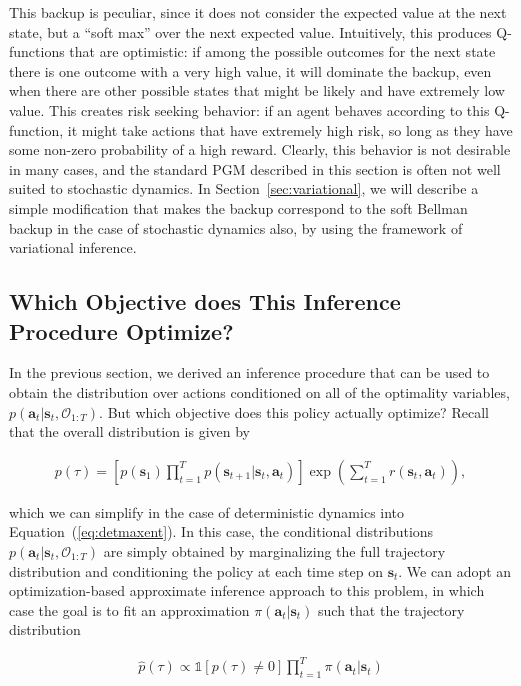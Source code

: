 This backup is peculiar, since it does not consider the expected value at the next state, but a ``soft max'' over the next expected value. Intuitively, this produces Q-functions that are optimistic: if among the possible outcomes for the next state there is one outcome with a very high value, it will dominate the backup, even when there are other possible states that might be likely and have extremely low value. This creates risk seeking behavior: if an agent behaves according to this Q-function, it might take actions that have extremely high risk, so long as they have some non-zero probability of a high reward. Clearly, this behavior is not desirable in many cases, and the standard PGM described in this section is often not well suited to stochastic dynamics. In Section~\ref{sec:variational}, we will describe a simple modification that makes the backup correspond to the soft Bellman backup in the case of stochastic dynamics also, by using the framework of variational inference.

\subsection{Which Objective does This Inference Procedure Optimize?}
\label{sec:maxentobjective}

In the previous section, we derived an inference procedure that can be used to obtain the distribution over actions conditioned on all of the optimality variables, $p(\mathbf{a}_t|\mathbf{s}_t,\mathcal{O}_{1:T})$. But which objective does this policy actually optimize? Recall that the overall distribution is given by

\begin{align}
p(\tau) = \left[ p(\mathbf{s}_1) \prod_{t=1}^T p(\mathbf{s}_{t+1}|\mathbf{s}_t,\mathbf{a}_t) \right] \exp\left( \sum_{t=1}^T r(\mathbf{s}_t,\mathbf{a}_t) \right), \label{eq:maxentdistro}
\end{align}

which we can simplify in the case of deterministic dynamics into Equation~(\ref{eq:detmaxent}). In this case, the conditional distributions $p(\mathbf{a}_t|\mathbf{s}_t,\mathcal{O}_{1:T})$ are simply obtained by marginalizing the full trajectory distribution and conditioning the policy at each time step on $\mathbf{s}_t$. We can adopt an optimization-based approximate inference approach to this problem, in which case the goal is to fit an approximation $\pi(\mathbf{a}_t|\mathbf{s}_t)$ such that the trajectory distribution

\begin{align*}
\hat{p}(\tau) \propto \mathds{1}[p(\tau) \neq 0] \prod_{t=1}^T \pi(\mathbf{a}_t|\mathbf{s}_t)
\end{align*}

